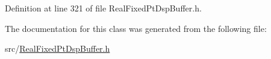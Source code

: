 Definition at line 321 of file Real\+Fixed\+Pt\+Dsp\+Buffer.\+h.



The documentation for this class was generated from the following file\+:\begin{DoxyCompactItemize}
\item 
src/\hyperlink{_real_fixed_pt_dsp_buffer_8h}{Real\+Fixed\+Pt\+Dsp\+Buffer.\+h}\end{DoxyCompactItemize}
